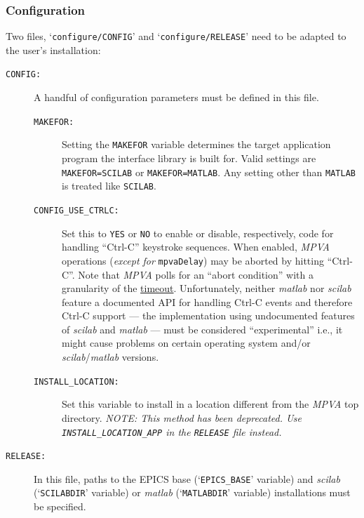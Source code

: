 \documentclass{article}
\newcommand{\sca}{\ita{MPVA}}
\newcommand{\scilab}{\ita{scilab}}
\newcommand{\matlab}{\ita{matlab}}
\newcommand{\ezca}{\ita{ezca}}
\newcommand{\com}[1]{{\tt #1}}
\newcommand{\pbrkf}{\pagebreak}
\newcommand{\ita}[1]{\emph{#1}}
\renewcommand{\pbrkf}{}
\begin{document}
\pbrkf
\subsubsection{Configuration}
Two files, `\com{configure/CONFIG}' and `\com{configure/RELEASE}' need to
be adapted to the user's installation:
\begin{description}
\item[\tt CONFIG:] A handful of configuration parameters must be defined
in this file.
\begin{description}
\item[\tt MAKEFOR:] Setting the \com{MAKEFOR} variable
determines the target application program the interface library is
built for. Valid settings are \com{MAKEFOR=SCILAB} or \com{MAKEFOR=MATLAB}.
Any setting other than \com{MATLAB} is treated like \com{SCILAB}.

\item[\tt CONFIG\_USE\_CTRLC:] Set this to {\tt YES} or {\tt NO} to enable
or disable, respectively, code for handling ``Ctrl-C'' keystroke sequences.
When enabled, \sca{} operations ({\em except for} \com{mpvaDelay}) may be aborted
by hitting ``Ctrl-C''.
Note that \sca{} polls for an ``abort condition'' with a granularity of the
\hyperref{\ezca{} timeout parameter}{timeout parameter (see }{)}{timeout}.
Unfortunately, neither \matlab{} nor \scilab{} feature a documented API for handling
Ctrl-C events and therefore Ctrl-C support --- the implementation using undocumented
features of \scilab{} and \matlab{} --- must be considered ``experimental''
i.e., it might cause problems on certain operating system and/or \scilab/\matlab{}
versions.

\item[\tt INSTALL\_LOCATION:] Set this variable to install in a location
different from the \sca{} top directory.
{\em NOTE: This method has been deprecated.
Use \com{INSTALL\_LOCATION\_APP} in the \com{RELEASE} file
instead.}
\end{description}
%
%
\item[\tt RELEASE:] In this file, paths to the EPICS base (`\com{EPICS\_BASE}'
variable) and \scilab{} (`\com{SCILABDIR}' variable) or \matlab{} (`\com{MATLABDIR}'
variable) installations must be specified.


\end{description}
\end{document}
